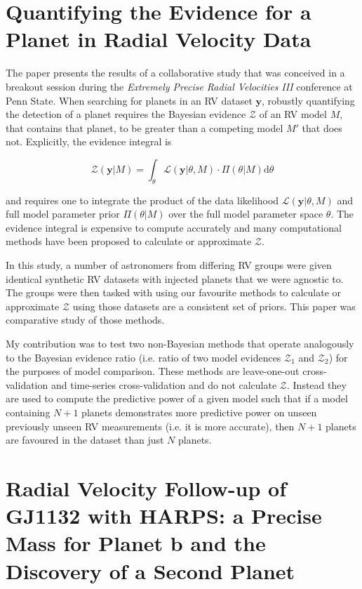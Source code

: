 \section{Quantifying the Evidence for a Planet in Radial Velocity Data
  \citep{nelson18}}
The paper presents the results of a collaborative study that was conceived in
a breakout session during the \emph{Extremely Precise Radial Velocities III}
conference at Penn State. When searching for planets in an RV dataset
$\mathbf{y}$, robustly 
quantifying the detection of a planet requires the Bayesian evidence
$\mathcal{Z}$ of an RV model $M$, that contains that planet, to
be greater than a competing model $M'$ that does not. Explicitly, the evidence
integral is

\begin{equation}
  \mathcal{Z}(\mathbf{y}|M) = \int_{\theta} \mathcal{L}(\mathbf{y}|\theta,M)
  \cdot \Pi(\theta|M) \text{d} \theta
\end{equation}

\noindent and requires one to integrate the product of the data likelihood
$\mathcal{L}(\mathbf{y}|\theta,M)$ and full model parameter prior
$\Pi(\theta|M)$ over the full model parameter space $\theta$.
The evidence integral is expensive to compute accurately and many computational
methods have been proposed to calculate or approximate $\mathcal{Z}$.

In this study, a number of astronomers from differing RV groups were given
identical synthetic RV
datasets with injected planets that we were agnostic to. The groups were then
tasked with using our favourite methods to calculate or approximate
$\mathcal{Z}$ using those datasets are a consistent set of priors. This paper
was comparative study of those methods.

My contribution was to test two non-Bayesian methods that operate
analogously to the Bayesian evidence ratio (i.e. ratio of two model evidences
$\mathcal{Z}_1$ and $\mathcal{Z}_2$) for the purposes of model comparison. These
methods are leave-one-out cross-validation and time-series cross-validation
and do not calculate $\mathcal{Z}$. Instead they are used to compute the
predictive power of a given model such that if a model containing $N+1$ planets
demonstrates more predictive power on unseen previously unseen RV measurements
(i.e. it is more accurate), then $N+1$ planets are favoured in the dataset
than just $N$ planets. 

\section{Radial Velocity Follow-up of GJ1132 with HARPS: a Precise Mass for
  Planet b and the Discovery of a Second Planet \citep{bonfils18}}
\label{sect:gj1132bonfils}


